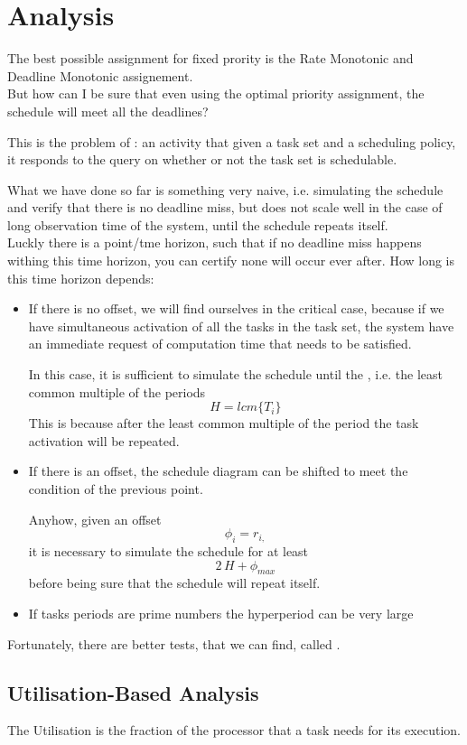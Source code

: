 \section{Analysis}
The best possible assignment for fixed prority is the Rate Monotonic and Deadline Monotonic assignement.\\
But how can I be sure that even using the optimal priority assignment, the schedule will meet all the deadlines?

This is the problem of : an activity that given a task set  and a scheduling policy, it responds to the query on whether or not the task set is schedulable.

What we have done so far is something very naive, i.e. simulating the schedule and verify that there is no deadline miss, but does not scale well in the case of long observation time of the system, until the schedule repeats itself. \\
Luckly there is a point/tme horizon, such that if no deadline miss happens withing this time horizon, you can certify none will occur ever after. How long is this time horizon depends:
\begin{itemize}
\item If there is no offset, we will find ourselves in the critical case, because if we have simultaneous activation of all the tasks in the task set, the system have an immediate request of computation time that needs to be satisfied.

In this case, it is sufficient  to simulate the schedule until the , i.e. the least common multiple of the periods
\[H = lcm\{T_i\}\]
This is because after the least common multiple of the period the task activation will be repeated.
\item If there is an offset, the schedule diagram can be shifted to meet the condition of the previous point.

Anyhow, given an offset
\[\phi_i = r_{i,}\]
it is necessary to simulate the schedule for at least 
\[2\,H + \phi_{max}\]
before being sure that the schedule will repeat itself.
\item If tasks periods are prime numbers the hyperperiod can be very large
\end{itemize}

Fortunately, there are better tests, that we can find, called .

\subsection{Utilisation-Based Analysis}
The Utilisation is the fraction of the processor that a task needs for its execution.


